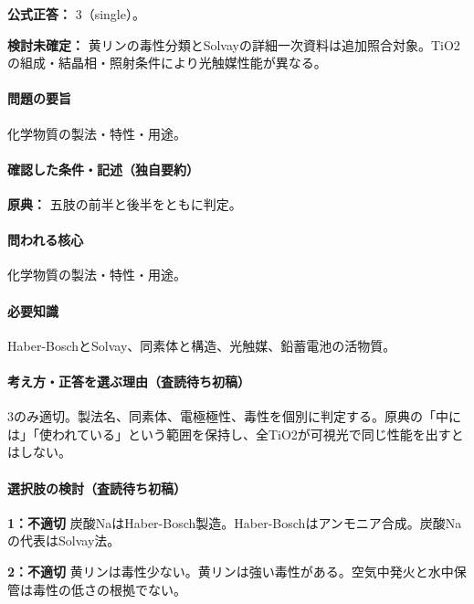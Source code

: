 \textbf{公式正答：} 3（single）。

\par\textbf{検討未確定：} 黄リンの毒性分類とSolvayの詳細一次資料は追加照合対象。TiO2の組成・結晶相・照射条件により光触媒性能が異なる。

\paragraph{問題の要旨} 化学物質の製法・特性・用途。

\paragraph{確認した条件・記述（独自要約）}\mbox{}\par

\noindent\textbf{原典：} 五肢の前半と後半をともに判定。\par

\paragraph{問われる核心} 化学物質の製法・特性・用途。

\paragraph{必要知識} Haber-BoschとSolvay、同素体と構造、光触媒、鉛蓄電池の活物質。

\paragraph{考え方・正答を選ぶ理由（査読待ち初稿）} 3のみ適切。製法名、同素体、電極極性、毒性を個別に判定する。原典の「中には」「使われている」という範囲を保持し、全TiO2が可視光で同じ性能を出すとはしない。

\paragraph{選択肢の検討（査読待ち初稿）}\mbox{}\par

\noindent\textbf{1：不適切} 炭酸NaはHaber-Bosch製造。Haber-Boschはアンモニア合成。炭酸Naの代表はSolvay法。\par

\noindent\textbf{2：不適切} 黄リンは毒性少ない。黄リンは強い毒性がある。空気中発火と水中保管は毒性の低さの根拠でない。\par

